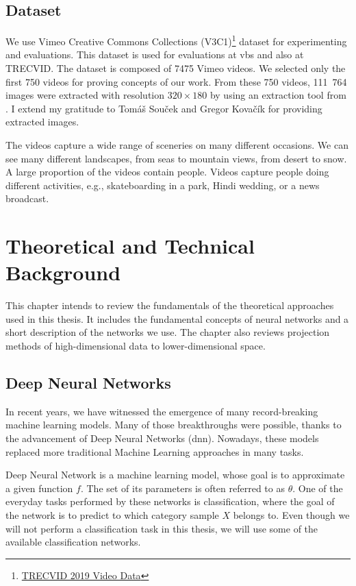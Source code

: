 \section{Dataset}
\label{s:dataset}

We use Vimeo Creative Commons Collections (V3C1)\footnote{\href{https://www-nlpir.nist.gov/projects/tv2019/data.html}{TRECVID 2019 Video Data}} dataset for experimenting and evaluations. This dataset is used for evaluations at \acrshort{vbs} and also at TRECVID. The dataset is composed of 7475 Vimeo videos. We selected only the first 750 videos for proving concepts of our work. From these 750 videos, 111\ 764 images were extracted with resolution $320\times180$ by using an extraction tool from \cite{lokovc2019framework}. I extend my gratitude to Tomáš Souček and Gregor Kovačík for providing extracted images.

The videos capture a wide range of sceneries on many different occasions. We can see many different landscapes, from seas to mountain views, from desert to snow. A large proportion of the videos contain people. Videos capture people doing different activities, e.g., skateboarding in a park, Hindi wedding, or a news broadcast.


\chapter{Theoretical and Technical Background}
\label{ch:technical_background}

This chapter intends to review the fundamentals of the theoretical approaches used in this thesis. It includes the fundamental concepts of neural networks and a short description of the networks we use. The chapter also reviews projection methods of high-dimensional data to lower-dimensional space.

\section{Deep Neural Networks}

In recent years, we have witnessed the emergence of many record-breaking machine learning models. Many of those breakthroughs were possible, thanks to the advancement of Deep Neural Networks (\acrshort{dnn}). Nowadays, these models replaced more traditional Machine Learning approaches in many tasks.

Deep Neural Network is a machine learning model, whose goal is to approximate a given function \(f\). The set of its parameters is often referred to as \(\theta\). One of the everyday tasks performed by these networks is classification, where the goal of the network is to predict to which category sample \(X\) belongs to. Even though we will not perform a classification task in this thesis, we will use some of the available classification networks.

